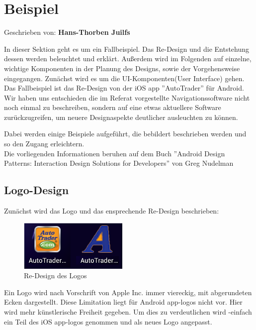 
\section{Beispiel}

Geschrieben von: \textbf{Hans-Thorben Juilfs}
\newline

In dieser Sektion geht es um ein Fallbeispiel. Das Re-Design und die Entstehung dessen werden beleuchtet und erklärt. Außerdem wird im Folgenden auf einzelne, wichtige Komponenten in der Planung des Designs, sowie der Vorgehensweise eingegangen. Zunächst wird es um die UI-Komponenten(User Interface) gehen.\\

Das Fallbeispiel ist das Re-Design von der iOS app ''AutoTrader'' für Android. Wir haben uns entschieden die im Referat vorgestellte Navigationssoftware nicht noch einmal zu beschreiben, sondern auf eine etwas aktuellere Software zurückzugreifen, um neuere Designaspekte deutlicher ausleuchten zu können.

Dabei werden einige Beispiele aufgeführt, die bebildert beschrieben werden und so den Zugang erleichtern.\\

Die vorliegenden Informationen beruhen auf dem Buch ''Android Design Patterns: Interaction Design Solutions for Developers'' von Greg Nudelman\\


\subsection{Logo-Design}
\label{sub:logodesign}
Zunächst wird das Logo und das ensprechende Re-Design beschrieben:\\

\begin{figure}[h]
 \centering
 \includegraphics[height=0.10\textheight]{img/logo.png}
 \caption{Re-Design des Logos}
\end{figure}

Ein Logo wird nach Vorschrift von Apple Inc. immer viereckig, mit abgerundeten Ecken dargestellt. Diese Limitation liegt für Android app-logos nicht vor. Hier wird mehr künstlerische Freiheit gegeben. Um dies zu verdeutlichen wird -einfach ein Teil des iOS app-logos genommen und als neues Logo angepasst.\cite{AndroidDesignPatterns}


